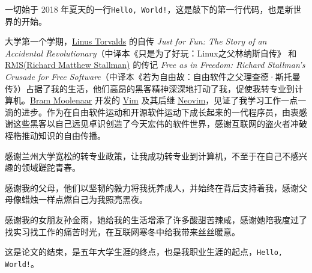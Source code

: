 \documentclass[AutoFakeBold]{LZUThesis}
\begin{document}
\begin{sloppypar}
\backmatter


\printbib
\nocite{*} %






\Thanks

一切始于 2018 年夏天的一行\texttt{Hello, World!}，这是敲下的第一行代码，也是新世界的开始。

大学第一个学期，\hyperlink{https://linuxtorvalds.com/}{Linus Torvalds} 的自传 \textit{Just for Fun: The Story of an Accidental Revolutionary}（中译本《只是为了好玩：Linux之父林纳斯自传》 和 \hyperlink{https://stallman.org/}{RMS(Richard Matthew Stallman)} 的传记 \textit{Free as in Freedom: Richard Stallman's Crusade for Free Software}（中译本《若为自由故：自由软件之父理查德·斯托曼传》）占据了我的生活，他们高昂的黑客精神深深地打动了我，促使我转专业到计算机。\hyperlink{https://www.moolenaar.net/}{Bram Moolenaar} 开发的 \hyperlink{https://www.vim.org/}{Vim} 及其后继 \hyperlink{https://neovim.io/}{Neovim}，见证了我学习工作一点一滴的进步。作为在自由软件运动和开源软件运动下成长起来的一代程序员，由衷感谢这些黑客以自己远见卓识创造了今天宏伟的软件世界，感谢互联网的盗火者冲破桎梏推动知识的自由传播。

感谢兰州大学宽松的转专业政策，让我成功转专业到计算机，不至于在自己不感兴趣的领域蹉跎青春。

感谢我的父母，他们以坚韧的毅力将我抚养成人，并始终在背后支持着我，感谢父母像蜡烛一样点燃自己为我照亮黑夜。

感谢我的女朋友孙金雨，她给我的生活增添了许多酸甜苦辣咸，感谢她陪我度过了找实习找工作的痛苦时光，在互联网寒冬中给我带来丝丝暖意。

这是论文的结束，是五年大学生涯的终点，也是我职业生涯的起点，\texttt{Hello, World!}。

\Grade %

\end{sloppypar}
\end{document}
